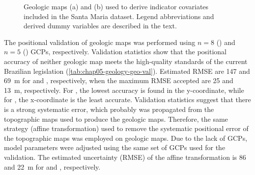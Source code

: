 \begin{figure}[!ht]
\begin{minipage}[b]{0.45\textwidth}
\end{minipage} 
\caption[Geologic maps included in the Santa Maria dataset.]{Geologic maps (a) \geoOld{} and (b) \geoNew{} used 
to derive indicator covariates included in the Santa Maria dataset. Legend abbreviations and derived dummy 
variables are described in the text.}
\label{fig:chap05-geo-maps}
\end{figure}

The positional validation of geologic maps was performed using $n = 8$ (\geoOld{}) and $n = 5$ (\geoNew{}) 
GCPs, respectively. Validation statistics show that the positional accuracy of neither geologic map meets the 
high-quality standards of the current Brazilian legislation (\autoref{tab:chap05-geology-geo-val}). Estimated 
RMSE are \num{147} and \SI{69}{\m} for \geoOld{} and \geoNew{}, respectively, when the maximum RMSE accepted 
are \num{25} and \SI{13}{\m}, respectively. For \geoOld{}, the lowest accuracy is found in the y-coordinate, 
while for \geoNew{}, the x-coordinate is the least accurate. Validation statistics suggest that there is a 
strong systematic error, which probably was propagated from the topographic maps used to produce the geologic 
maps. Therefore, the same strategy (affine transformation) used to remove the systematic positional error of 
the topographic maps was employed on geologic maps. Due to the lack of GCPs, model parameters were adjusted 
using the same set of GCPs used for the validation. The estimated uncertainty (RMSE) of the affine 
transformation is \num{86} and \SI{22}{\m} for \geoOld{} and \geoNew{}, respectively.


